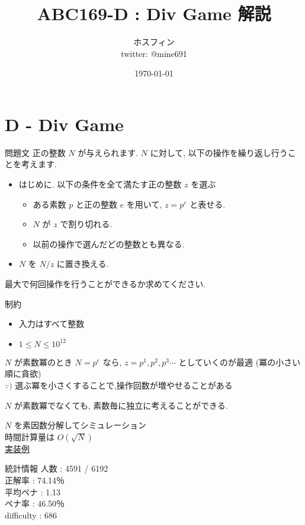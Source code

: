 \documentclass[dvipdfmx,12pt]{beamer}%
\title{ABC169-D : Div Game 解説}
\author{ホスフィン \\ twitter: @mine691}
\date{\today}
\begin{document}
\maketitle
%
%
\section{D - Div Game}
\begin{frame}
\begin{block}{問題文}
正の整数 $ N $ が与えられます. $ N $ に対して, 以下の操作を繰り返し行うことを考えます.
	\begin{itemize}
		\item はじめに. 以下の条件を全て満たす正の整数 $ z $ を選ぶ
		\begin{itemize}
				\item ある素数 $ p $ と正の整数 $ e $ を用いて, $ z = p ^ e $ と表せる.
				\item $ N $ が $ z $ で割り切れる.
				\item 以前の操作で選んだどの整数とも異なる.
		\end{itemize}
		\item $ N $ を $ N / z $ に置き換える.
	\end{itemize}
最大で何回操作を行うことができるか求めてください.
\end{block}
\begin{exampleblock}{制約}
	\begin{itemize}
		\item 入力はすべて整数
		\item $1 \leq N \leq 10 ^ {12}$
	\end{itemize}
\end{exampleblock}
\end{frame}

\begin{frame}
\begin{exampleblock}{ $N$ が素数冪のとき}
	$ N = p ^ e $ なら, $ z =  p ^ 1, p ^ 2, p ^ 3 \cdots $ としていくのが最適 (冪の小さい順に貪欲)\\
	$ \because ) $ 選ぶ冪を小さくすることで,操作回数が増やせることがある
\end{exampleblock}

$ N $ が素数冪でなくても, 素数毎に独立に考えることができる.\\
\end{frame}

\begin{frame}
$ N $ を素因数分解してシミュレーション \\
時間計算量は $ O ( \sqrt{N} ) $ \\

\href{https://atcoder.jp/contests/abc169/submissions/13986174}{実装例}
\end{frame}

\begin{frame}{統計情報}
人数 : 4591 / 6192 \\
正解率 : 74.14％ \\
平均ペナ : 1.13 \\
ペナ率 : 46.50％ \\ 
difficulty : 686 \\ 

\end{frame}
%
%
\end{document}

